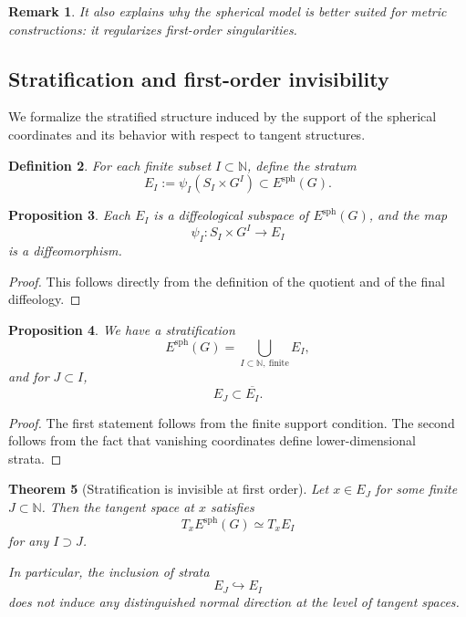 \documentclass[11pt]{amsart}
\newtheorem{theorem}{Theorem}[section]
\newtheorem{proposition}[theorem]{Proposition}
\newtheorem{definition}[theorem]{Definition}
\newtheorem{remark}[theorem]{Remark}
\begin{document}
\begin{remark}
It also explains why the spherical model is better suited for metric constructions: it regularizes first-order singularities.
\end{remark}
\subsection{Stratification and first-order invisibility}

We formalize the stratified structure induced by the support of the spherical coordinates and its behavior with respect to tangent structures.

\begin{definition}
For each finite subset $I \subset \mathbb{N}$, define the stratum
\[
E_I := \psi_I(S_I \times G^I) \subset E^{\mathrm{sph}}(G).
\]
\end{definition}

\begin{proposition}
Each $E_I$ is a diffeological subspace of $E^{\mathrm{sph}}(G)$, and the map
\[
\psi_I : S_I \times G^I \longrightarrow E_I
\]
is a diffeomorphism.
\end{proposition}

\begin{proof}
This follows directly from the definition of the quotient and of the final diffeology.
\end{proof}

\begin{proposition}
We have a stratification
\[
E^{\mathrm{sph}}(G) = \bigcup_{I \subset \mathbb{N},\ \text{finite}} E_I,
\]
and for $J \subset I$,
\[
E_J \subset \overline{E_I}.
\]
\end{proposition}

\begin{proof}
The first statement follows from the finite support condition. The second follows from the fact that vanishing coordinates define lower-dimensional strata.
\end{proof}

\begin{theorem}[Stratification is invisible at first order]
Let $x \in E_J$ for some finite $J \subset \mathbb{N}$. Then the tangent space at $x$ satisfies
\[
T_x E^{\mathrm{sph}}(G) \simeq T_x E_I
\]
for any $I \supset J$.

In particular, the inclusion of strata
\[
E_J \hookrightarrow E_I
\]
does not induce any distinguished normal direction at the level of tangent spaces.
\end{theorem}
\end{document}
